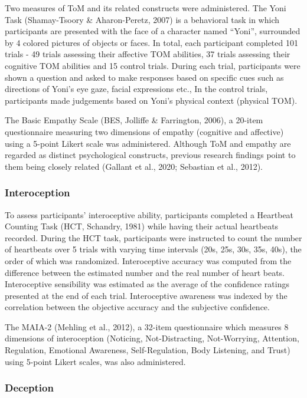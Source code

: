\documentclass[
  man,mask,floatsintext]{apa6}
\begin{document}
Two measures of ToM and its related constructs were administered. The Yoni Task (Shamay-Tsoory \& Aharon-Peretz, 2007) is a behavioral task in which participants are presented with the face of a character named ``Yoni'', surrounded by 4 colored pictures of objects or faces. In total, each participant completed 101 trials - 49 trials assessing their affective TOM abilities, 37 trials assessing their cognitive TOM abilities and 15 control trials. During each trial, participants were shown a question and asked to make responses based on specific cues such as directions of Yoni's eye gaze, facial expressions etc., In the control trials, participants made judgements based on Yoni's physical context (physical TOM).

The Basic Empathy Scale (BES, Jolliffe \& Farrington, 2006), a 20-item questionnaire measuring two dimensions of empathy (cognitive and affective) using a 5-point Likert scale was administered. Although ToM and empathy are regarded as distinct psychological constructs, previous research findings point to them being closely related (Gallant et al., 2020; Sebastian et al., 2012).

\hypertarget{interoception}{%
\subsubsection{Interoception}\label{interoception}}

To assess participants' interoceptive ability, participants completed a Heartbeat Counting Task (HCT, Schandry, 1981) while having their actual heartbeats recorded. During the HCT task, participants were instructed to count the number of heartbeats over 5 trials with varying time intervals (20s, 25s, 30s, 35s, 40s), the order of which was randomized. Interoceptive accuracy was computed from the difference between the estimated number and the real number of heart beats. Interoceptive sensibility was estimated as the average of the confidence ratings presented at the end of each trial. Interoceptive awareness was indexed by the correlation between the objective accuracy and the subjective confidence.

The MAIA-2 (Mehling et al., 2012), a 32-item questionnaire which measures 8 dimensions of interoception (Noticing, Not-Distracting, Not-Worrying, Attention, Regulation, Emotional Awareness, Self-Regulation, Body Listening, and Trust) using 5-point Likert scales, was also administered.

\hypertarget{deception}{%
\subsubsection{Deception}\label{deception}}
\end{document}
